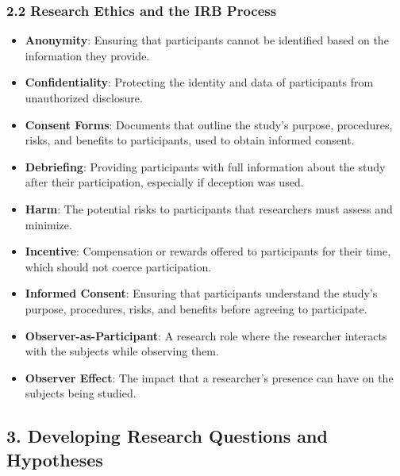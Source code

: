 \documentclass[
]{book}
\providecommand{\tightlist}{%
  \setlength{\itemsep}{0pt}\setlength{\parskip}{0pt}}
\begin{document}
\subsubsection*{\texorpdfstring{\textbf{2.2 Research Ethics and the IRB Process}}{2.2 Research Ethics and the IRB Process}}\label{research-ethics-and-the-irb-process-1}

\begin{itemize}
\tightlist
\item
  \textbf{Anonymity}: Ensuring that participants cannot be identified based on the information they provide.
\item
  \textbf{Confidentiality}: Protecting the identity and data of participants from unauthorized disclosure.
\item
  \textbf{Consent Forms}: Documents that outline the study's purpose, procedures, risks, and benefits to participants, used to obtain informed consent.
\item
  \textbf{Debriefing}: Providing participants with full information about the study after their participation, especially if deception was used.
\item
  \textbf{Harm}: The potential risks to participants that researchers must assess and minimize.
\item
  \textbf{Incentive}: Compensation or rewards offered to participants for their time, which should not coerce participation.
\item
  \textbf{Informed Consent}: Ensuring that participants understand the study's purpose, procedures, risks, and benefits before agreeing to participate.
\item
  \textbf{Observer-as-Participant}: A research role where the researcher interacts with the subjects while observing them.
\item
  \textbf{Observer Effect}: The impact that a researcher's presence can have on the subjects being studied.
\end{itemize}

\subsection*{\texorpdfstring{3. \textbf{Developing Research Questions and Hypotheses}}{3. Developing Research Questions and Hypotheses}}\label{developing-research-questions-and-hypotheses-1}
\end{document}
